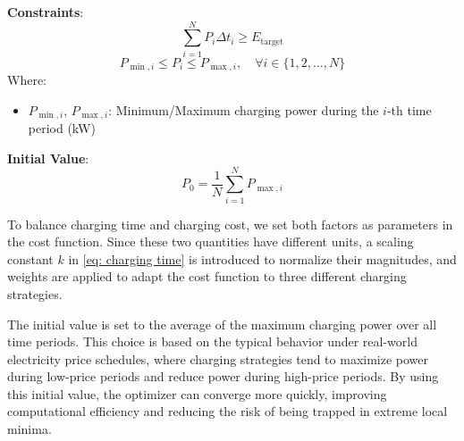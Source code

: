 \documentclass[
	english,
	ruledheaders=section,%
	class=report,%
	thesis={type=Report},%
	accentcolor=9c,%
	custommargins=true,%
	marginpar=false,%
	parskip=half-,%
	fontsize=11pt,%
	logofile={img/tuda_logo.pdf}, %
]{tudapub}
\begin{document}
\textbf{Constraints}: 
\begin{equation}
\sum_{i=1}^{N} P_i \Delta t_i \geq E_{\text{target}}
\end{equation}
\begin{equation}
P_{\min, i} \leq P_i \leq P_{\max, i}, \quad \forall i \in \{1, 2, \dots, N\}
\end{equation}
Where: 
\begin{itemize}
    \item $P_{\min, i}$, $P_{\max, i}$: Minimum/Maximum charging power during the $i$-th time period (kW)
\end{itemize}

\textbf{Initial Value}: 
\begin{equation}
P_0 = \frac{1}{N} \sum_{i=1}^{N} P_{\max, i}
\end{equation}




To balance charging time and charging cost, we set both factors as parameters in the cost function. Since these two quantities have different units, a scaling constant $k$ in \autoref{eq: charging time} is introduced to normalize their magnitudes, and weights are applied to adapt the cost function to three different charging strategies.




The initial value is set to the average of the maximum charging power over all time periods. This choice is based on the typical behavior under real-world electricity price schedules, where charging strategies tend to maximize power during low-price periods and reduce power during high-price periods. By using this initial value, the optimizer can converge more quickly, improving computational efficiency and reducing the risk of being trapped in extreme local minima.
\end{document}
